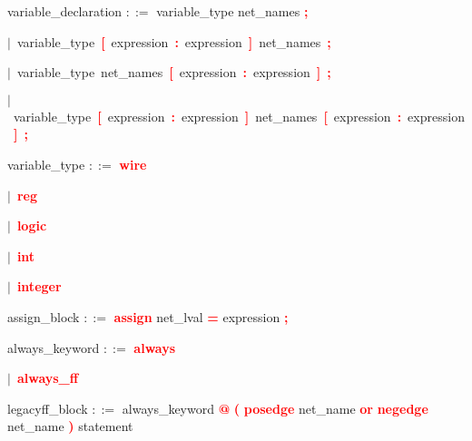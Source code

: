 \vspace{1em}
\noindent
\settowidth{\parindent}{\hspace{4ex}}
variable\_declaration $::=$\hspace{1ex} variable\_type net\_names \textbf{\textcolor{red}{;}}

\mbox{$|$ variable\_type \textbf{\textcolor{red}{[}} expression \textbf{\textcolor{red}{:}} expression \textbf{\textcolor{red}{]}} net\_names \textbf{\textcolor{red}{;}}}

\mbox{$|$ variable\_type net\_names \textbf{\textcolor{red}{[}} expression \textbf{\textcolor{red}{:}} expression \textbf{\textcolor{red}{]}} \textbf{\textcolor{red}{;}}}

\mbox{$|$ variable\_type \textbf{\textcolor{red}{[}} expression \textbf{\textcolor{red}{:}} expression \textbf{\textcolor{red}{]}} net\_names \textbf{\textcolor{red}{[}} expression \textbf{\textcolor{red}{:}} expression \textbf{\textcolor{red}{]}} \textbf{\textcolor{red}{;}}}

\vspace{1em}
\noindent
\settowidth{\parindent}{\hspace{4ex}}
variable\_type $::=$\hspace{1ex} \textbf{\textcolor{red}{wire}}

\mbox{$|$ \textbf{\textcolor{red}{reg}}}

\mbox{$|$ \textbf{\textcolor{red}{logic}}}

\mbox{$|$ \textbf{\textcolor{red}{int}}}

\mbox{$|$ \textbf{\textcolor{red}{integer}}}

\vspace{1em}
\noindent
\settowidth{\parindent}{\hspace{4ex}}
assign\_block $::=$\hspace{1ex} \textbf{\textcolor{red}{assign}} net\_lval \textbf{\textcolor{red}{=}} expression \textbf{\textcolor{red}{;}}

\vspace{1em}
\noindent
\settowidth{\parindent}{\hspace{4ex}}
always\_keyword $::=$\hspace{1ex} \textbf{\textcolor{red}{always}}

\mbox{$|$ \textbf{\textcolor{red}{always\_ff}}}

\vspace{1em}
\noindent
\settowidth{\parindent}{\hspace{4ex}}
legacyff\_block $::=$\hspace{1ex} always\_keyword \textbf{\textcolor{red}{@}} \textbf{\textcolor{red}{(}} \textbf{\textcolor{red}{posedge}} net\_name \textbf{\textcolor{red}{or}} \textbf{\textcolor{red}{negedge}} net\_name \textbf{\textcolor{red}{)}} statement

